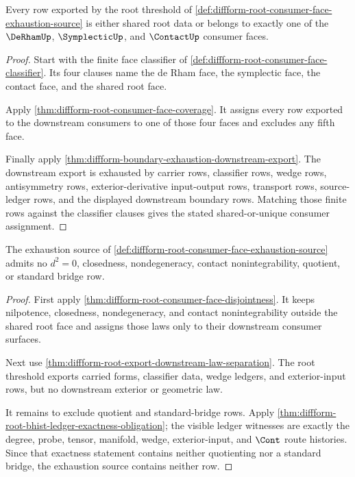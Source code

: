 \begin{theorem}
\label{thm:diffform-root-consumer-face-exhaustion}
Every row exported by the root threshold of
\autoref{def:diffform-root-consumer-face-exhaustion-source} is either shared
root data or belongs to exactly one of the $\DeRhamUp$, $\SymplecticUp$, and
$\ContactUp$ consumer faces.
\end{theorem}
\begin{proof}
Start with the finite face classifier of
\autoref{def:diffform-root-consumer-face-classifier}. Its four clauses name the
de Rham face, the symplectic face, the contact face, and the shared root face.

Apply \autoref{thm:diffform-root-consumer-face-coverage}. It assigns every row
exported to the downstream consumers to one of those four faces and excludes
any fifth face.

Finally apply
\autoref{thm:diffform-boundary-exhaustion-downstream-export}. The downstream
export is exhausted by carrier rows, classifier rows, wedge rows,
antisymmetry rows, exterior-derivative input-output rows, transport rows,
source-ledger rows, and the displayed downstream boundary rows. Matching those
finite rows against the classifier clauses gives the stated shared-or-unique
consumer assignment.
\end{proof}

\begin{theorem}
\label{thm:diffform-root-consumer-boundary-exactness}
The exhaustion source of
\autoref{def:diffform-root-consumer-face-exhaustion-source} admits no $d^2=0$,
closedness, nondegeneracy, contact nonintegrability, quotient, or standard
bridge row.
\end{theorem}
\begin{proof}
First apply \autoref{thm:diffform-root-consumer-face-disjointness}. It keeps
nilpotence, closedness, nondegeneracy, and contact nonintegrability outside the
shared root face and assigns those laws only to their downstream consumer
surfaces.

Next use \autoref{thm:diffform-root-export-downstream-law-separation}. The root
threshold exports carried forms, classifier data, wedge ledgers, and
exterior-input rows, but no downstream exterior or geometric law.

It remains to exclude quotient and standard-bridge rows. Apply
\autoref{thm:diffform-root-bhist-ledger-exactness-obligation}; the visible
ledger witnesses are exactly the degree, probe, tensor, manifold, wedge,
exterior-input, and $\Cont$ route histories. Since that exactness statement
contains neither quotienting nor a standard bridge, the exhaustion source
contains neither row.
\end{proof}

